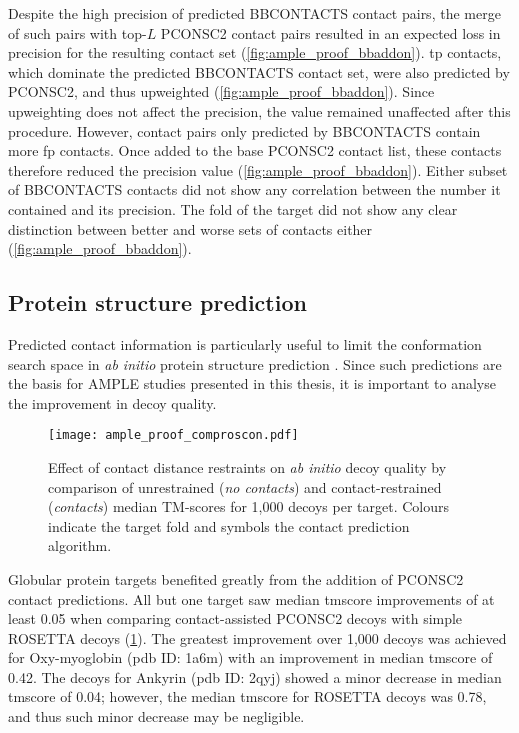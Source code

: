Despite the high precision of predicted BBCONTACTS contact pairs, the merge of such pairs with top-$L$ PCONSC2 contact pairs resulted in an expected loss in precision for the resulting contact set (\cref{fig:ample_proof_bbaddon}). \Gls{tp} contacts, which dominate the predicted BBCONTACTS contact set, were also predicted by PCONSC2, and thus upweighted (\cref{fig:ample_proof_bbaddon}). Since upweighting does not affect the precision, the value remained unaffected after this procedure. However, contact pairs only predicted by BBCONTACTS contain more \gls{fp} contacts. Once added to the base PCONSC2 contact list, these contacts therefore reduced the precision value (\cref{fig:ample_proof_bbaddon}). Either subset of BBCONTACTS contacts did not show any correlation between the number it contained and its precision. The fold of the target did not show any clear distinction between better and worse sets of contacts either (\cref{fig:ample_proof_bbaddon}).

\subsection{Protein structure prediction} \label{subsec:ample_proof_strupred}
Predicted contact information is particularly useful to limit the conformation search space in \textit{ab initio} protein structure prediction \cite{Lee2017-oc}. Since such predictions are the basis for AMPLE studies presented in this thesis, it is important to analyse the improvement in decoy quality.

\begin{figure}[H]
    \centering
    \texttt{[image: ample\_proof\_comproscon.pdf]}
    \caption[Effect of contact distance restraints on \textit{ab initio} decoy quality]{Effect of contact distance restraints on \textit{ab initio} decoy quality by comparison of unrestrained (\textit{no contacts}) and contact-restrained (\textit{contacts}) median TM-scores for 1,000 decoys per target. Colours indicate the target fold and symbols the contact prediction algorithm.}
    \label{fig:ample_proof_comproscon}
\end{figure}

Globular protein targets benefited greatly from the addition of PCONSC2 contact predictions. All but one target saw median \gls{tmscore} improvements of at least 0.05 when comparing contact-assisted PCONSC2 decoys with simple ROSETTA decoys (\cref{fig:ample_proof_comproscon}). The greatest improvement over 1,000 decoys was achieved for Oxy-myoglobin (\gls{pdb} ID: 1a6m) with an improvement in median \gls{tmscore} of 0.42.  The decoys for Ankyrin (\gls{pdb} ID: 2qyj) showed a minor decrease in median \gls{tmscore} of 0.04; however, the median \gls{tmscore} for ROSETTA decoys was 0.78, and thus such minor decrease may be negligible. 

